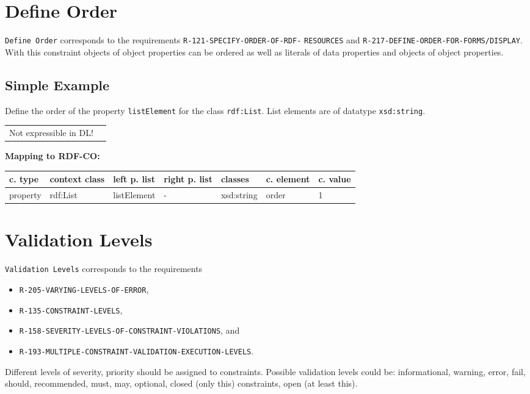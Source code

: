 \documentclass{llncs}
\newcommand{\ms}[1]{\texttt{#1}}
\newenvironment{gcotable}{
  \scriptsize
  \sffamily
  \vspace{0cm}
	\begin{center}
	\textbf{\vspace{0.4cm}Mapping to RDF-CO:} \\
  \begin{tabular}{l|l|l|l|l|l|l}
	\hline
  \textbf{c. type} & \textbf{context class} & \textbf{left p. list} & \textbf{right p. list} & \textbf{classes} & \textbf{c. element} & \textbf{c. value} \\
  \hline

}{
  \hline
  \end{tabular}
	\end{center}
}
\newenvironment{DL}{
  \vspace{0cm}
	\begin{center}
  \begin{tabular}{r l}

}{
  \end{tabular}
	\end{center}
}
\begin{document}
%

\section{Define Order}

\ms{Define Order} corresponds to the requirements
\ms{R-121-SPECIFY-ORDER-OF-RDF-} \ms{RESOURCES} and
\ms{R-217-DEFINE-ORDER-FOR-FORMS/DISPLAY}.
With this constraint objects of object properties can be ordered as well as literals of data properties and objects of object properties.

\subsection{Simple Example}

Define the order of the property \ms{listElement} for the class \ms{rdf:List}.
List elements are of datatype \ms{xsd:string}.

\begin{DL}
Not expressible in DL!
\end{DL}

\begin{gcotable}
property & rdf:List & listElement & - & xsd:string & order & 1 \\
\end{gcotable}

\section{Validation Levels}

\ms{Validation Levels} corresponds to the requirements

\begin{itemize}
	\item \ms{R-205-VARYING-LEVELS-OF-ERROR},
	\item \ms{R-135-CONSTRAINT-LEVELS},
	\item \ms{R-158-SEVERITY-LEVELS-OF-CONSTRAINT-VIOLATIONS}, and
	\item \ms{R-193-MULTIPLE-CONSTRAINT-VALIDATION-EXECUTION-LEVELS}.
\end{itemize}

Different levels of severity, priority should be assigned to constraints.
Possible validation levels could be: informational, warning, error, fail, should, recommended, must, may, optional, closed (only this) constraints, open (at least this).
\end{document}
